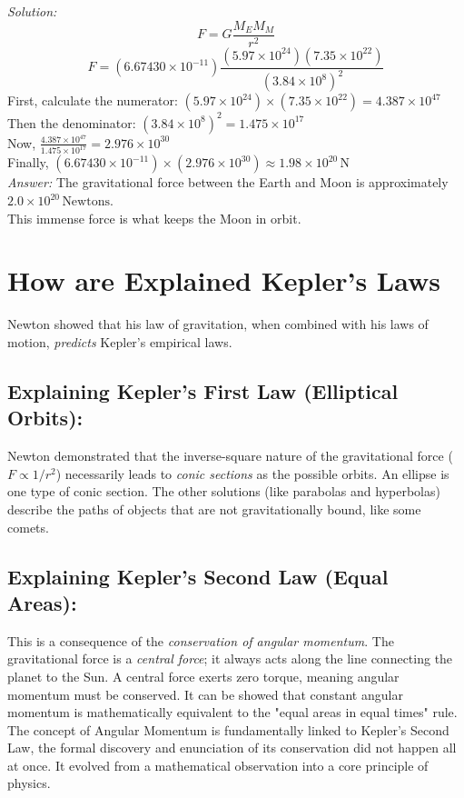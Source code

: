 \documentclass[a4paper,10pt]{article}
\begin{document}
\emph{Solution:}\\
\[
F = G \frac{M_E M_M}{r^2}
\]
\[
F = (6.67430 \times 10^{-11}) \frac{(5.97 \times 10^{24})(7.35 \times 10^{22})}{(3.84 \times 10^8)^2}
\]
First, calculate the numerator: \( (5.97 \times 10^{24}) \times (7.35 \times 10^{22}) = 4.387 \times 10^{47} \)\\
Then the denominator: \( (3.84 \times 10^8)^2 = 1.475 \times 10^{17} \)\\
Now, \( \frac{4.387 \times 10^{47}}{1.475 \times 10^{17}} = 2.976 \times 10^{30} \)\\
Finally, \( (6.67430 \times 10^{-11}) \times (2.976 \times 10^{30}) \approx 1.98 \times 10^{20} \, \text{N} \)\\
\emph{Answer:} The gravitational force between the Earth and Moon is approximately \( 2.0 \times 10^{20} \, \text{Newtons} \).\\
This immense force is what keeps the Moon in orbit.

\section{How are Explained Kepler's Laws}
Newton showed that his law of gravitation, when combined with his laws of motion, \emph{predicts} Kepler's empirical laws.
\subsection{Explaining Kepler's First Law (Elliptical Orbits):}
Newton demonstrated that the inverse-square nature of the gravitational force (\( F \propto 1/r^2 \)) necessarily leads to \emph{conic sections} as the possible orbits. An ellipse is one type of conic section. The other solutions (like parabolas and hyperbolas) describe the paths of objects that are not gravitationally bound, like some comets.
\subsection{Explaining Kepler's Second Law (Equal Areas):}
This is a consequence of the \emph{conservation of angular momentum}. The gravitational force is a \emph{central force}; it always acts along the line connecting the planet to the Sun. A central force exerts zero torque, meaning angular momentum must be conserved. It can be showed that constant angular momentum is mathematically equivalent to the "equal areas in equal times" rule.\\
The concept of Angular Momentum is fundamentally linked to Kepler’s Second Law, the formal discovery and enunciation of its conservation did not happen all at once. It evolved from a mathematical observation into a core principle of physics.
\end{document}

